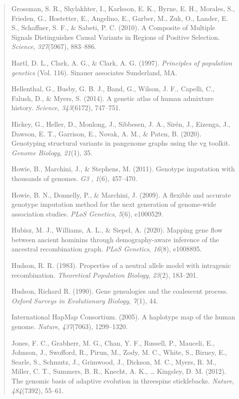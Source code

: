 \documentclass[
]{article}
\begin{document}
\begin{quote}
Grossman, S. R., Shylakhter, I., Karlsson, E. K., Byrne, E. H., Morales,
S., Frieden, G., Hostetter, E., Angelino, E., Garber, M., Zuk, O.,
Lander, E. S., Schaffner, S. F., \& Sabeti, P. C. (2010). A Composite of
Multiple Signals Distinguishes Causal Variants in Regions of Positive
Selection. \emph{Science}, \emph{327}(5967), 883--886.

Hartl, D. L., Clark, A. G., \& Clark, A. G. (1997). \emph{Principles of
population genetics} (Vol. 116). Sinauer associates Sunderland, MA.

Hellenthal, G., Busby, G. B. J., Band, G., Wilson, J. F., Capelli, C.,
Falush, D., \& Myers, S. (2014). A genetic atlas of human admixture
history. \emph{Science}, \emph{343}(6172), 747--751.

Hickey, G., Heller, D., Monlong, J., Sibbesen, J. A., Sirén, J.,
Eizenga, J., Dawson, E. T., Garrison, E., Novak, A. M., \& Paten, B.
(2020). Genotyping structural variants in pangenome graphs using the vg
toolkit. \emph{Genome Biology}, \emph{21}(1), 35.

Howie, B., Marchini, J., \& Stephens, M. (2011). Genotype imputation
with thousands of genomes. \emph{G3} , \emph{1}(6), 457--470.

Howie, B. N., Donnelly, P., \& Marchini, J. (2009). A flexible and
accurate genotype imputation method for the next generation of
genome-wide association studies. \emph{PLoS Genetics}, \emph{5}(6),
e1000529.

Hubisz, M. J., Williams, A. L., \& Siepel, A. (2020). Mapping gene flow
between ancient hominins through demography-aware inference of the
ancestral recombination graph. \emph{PLoS Genetics}, \emph{16}(8),
e1008895.

Hudson, R. R. (1983). Properties of a neutral allele model with
intragenic recombination. \emph{Theoretical Population Biology},
\emph{23}(2), 183--201.

Hudson, Richard R. (1990). Gene genealogies and the coalescent process.
\emph{Oxford Surveys in Evolutionary Biology}, \emph{7}(1), 44.

International HapMap Consortium. (2005). A haplotype map of the human
genome. \emph{Nature}, \emph{437}(7063), 1299--1320.

Jones, F. C., Grabherr, M. G., Chan, Y. F., Russell, P., Mauceli, E.,
Johnson, J., Swofford, R., Pirun, M., Zody, M. C., White, S., Birney,
E., Searle, S., Schmutz, J., Grimwood, J., Dickson, M. C., Myers, R. M.,
Miller, C. T., Summers, B. R., Knecht, A. K., \ldots{} Kingsley, D. M.
(2012). The genomic basis of adaptive evolution in threespine
sticklebacks. \emph{Nature}, \emph{484}(7392), 55--61.


\end{quote}
\end{document}
